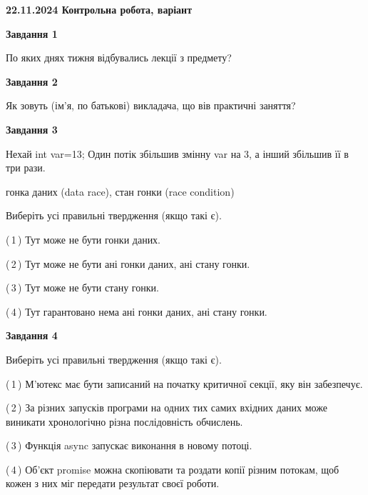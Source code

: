 \documentclass[12pt, ukrainian]{article}
\begin{document}
\begin {large}

\textbf{22.11.2024 Контрольна робота, варіант  }\par


{

\begin{center}
\textbf{Завдання 1}
\end{center}

По яких днях тижня відбувались лекції з предмету?


\begin{center}
\textbf{Завдання 2}
\end{center}

Як зовуть (ім'я, по батькові) викладача, що вів практичні заняття?


\begin{center}
\textbf{Завдання 3}
\end{center}

Нехай int var=13; Один потік збільшив змінну var на 3, а інший збільшив її в три рази.

гонка даних (data race), стан гонки (race condition)

Виберіть усі правильні твердження (якщо такі є).\par
\vspace{2mm}
(\,1\,) Тут може не бути гонки даних.%

(\,2\,) Тут може не бути ані гонки даних, ані стану гонки.%

(\,3\,) Тут може не бути стану гонки.%

(\,4\,) Тут гарантовано нема ані гонки даних, ані стану гонки.%


\begin{center}
\textbf{Завдання 4}
\end{center}

Виберіть усі правильні твердження (якщо такі є).\par
\vspace{2mm}

(\,1\,) М’ютекс має бути записаний на початку критичної секції, яку він забезпечує.%

(\,2\,) За різних запусків програми на одних тих самих вхідних даних може виникати хронологічно різна послідовність обчислень.%

(\,3\,) Функція async запускає виконання в новому потоці.%

(\,4\,) Об’єкт promise можна скопіювати та роздати копії різним потокам, щоб кожен з них міг передати результат своєї роботи.%


}
\end{large}
\end{document}
